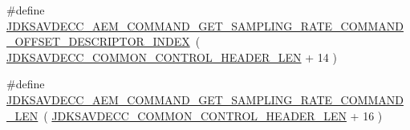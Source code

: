 \begin{DoxyCompactItemize}
\item 
\#define \hyperlink{group__command__get__sampling__rate_gaa2f788bd8f425adaca11afe02988b591}{J\+D\+K\+S\+A\+V\+D\+E\+C\+C\+\_\+\+A\+E\+M\+\_\+\+C\+O\+M\+M\+A\+N\+D\+\_\+\+G\+E\+T\+\_\+\+S\+A\+M\+P\+L\+I\+N\+G\+\_\+\+R\+A\+T\+E\+\_\+\+C\+O\+M\+M\+A\+N\+D\+\_\+\+O\+F\+F\+S\+E\+T\+\_\+\+D\+E\+S\+C\+R\+I\+P\+T\+O\+R\+\_\+\+I\+N\+D\+EX}~( \hyperlink{group__jdksavdecc__avtp__common__control__header_gaae84052886fb1bb42f3bc5f85b741dff}{J\+D\+K\+S\+A\+V\+D\+E\+C\+C\+\_\+\+C\+O\+M\+M\+O\+N\+\_\+\+C\+O\+N\+T\+R\+O\+L\+\_\+\+H\+E\+A\+D\+E\+R\+\_\+\+L\+EN} + 14 )
\item 
\#define \hyperlink{group__command__get__sampling__rate_ga70296b98d56a54d0aae462688f789445}{J\+D\+K\+S\+A\+V\+D\+E\+C\+C\+\_\+\+A\+E\+M\+\_\+\+C\+O\+M\+M\+A\+N\+D\+\_\+\+G\+E\+T\+\_\+\+S\+A\+M\+P\+L\+I\+N\+G\+\_\+\+R\+A\+T\+E\+\_\+\+C\+O\+M\+M\+A\+N\+D\+\_\+\+L\+EN}~( \hyperlink{group__jdksavdecc__avtp__common__control__header_gaae84052886fb1bb42f3bc5f85b741dff}{J\+D\+K\+S\+A\+V\+D\+E\+C\+C\+\_\+\+C\+O\+M\+M\+O\+N\+\_\+\+C\+O\+N\+T\+R\+O\+L\+\_\+\+H\+E\+A\+D\+E\+R\+\_\+\+L\+EN} + 16 )
\end{DoxyCompactItemize}
